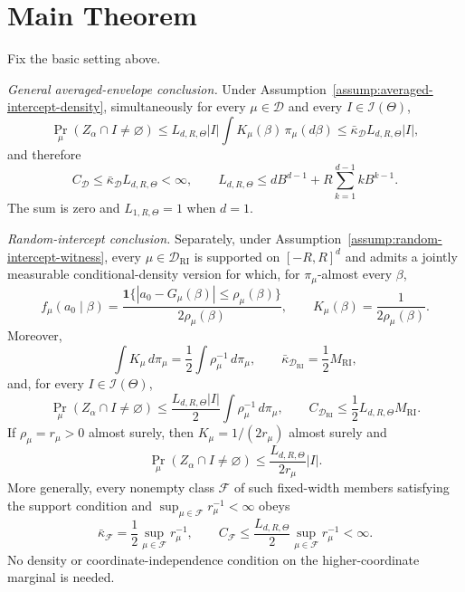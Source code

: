 \section{Main Theorem}

\begin{theorem}
\label{thm:main}
Fix the basic setting above.

\emph{General averaged-envelope conclusion.}
Under Assumption~\ref{assump:averaged-intercept-density}, simultaneously
for every $\mu\in\mathcal D$ and every
$I\in\mathscr I(\Theta)$,
\[
\Pr_\mu(Z_\alpha\cap I\neq\varnothing)
\leq L_{d,R,\Theta}|I|
      \int K_\mu(\beta)\,\pi_\mu(d\beta)
\leq\bar\kappa_{\mathcal D}L_{d,R,\Theta}|I|,
\]
and therefore
\[
C_{\mathcal D}
\leq\bar\kappa_{\mathcal D}L_{d,R,\Theta}<\infty,
\qquad
L_{d,R,\Theta}
\leq dB^{d-1}+R\sum_{k=1}^{d-1}kB^{k-1}.
\]
The sum is zero and $L_{1,R,\Theta}=1$ when $d=1$.

\emph{Random-intercept conclusion.}
Separately, under
Assumption~\ref{assump:random-intercept-witness}, every
$\mu\in\mathcal D_{\mathrm{RI}}$ is supported on $[-R,R]^d$ and admits
a jointly measurable conditional-density version for which, for
$\pi_\mu$-almost every $\beta$,
\[
f_\mu(a_0\mid\beta)
=\frac{\mathbf 1\{|a_0-G_\mu(\beta)|\leq\rho_\mu(\beta)\}}
       {2\rho_\mu(\beta)},
\qquad
K_\mu(\beta)=\frac{1}{2\rho_\mu(\beta)}.
\]
Moreover,
\[
\int K_\mu\,d\pi_\mu
=\frac12\int\rho_\mu^{-1}\,d\pi_\mu,
\qquad
\bar\kappa_{\mathcal D_{\mathrm{RI}}}
=\frac12M_{\mathrm{RI}},
\]
and, for every $I\in\mathscr I(\Theta)$,
\[
\Pr_\mu(Z_\alpha\cap I\neq\varnothing)
\leq\frac{L_{d,R,\Theta}|I|}{2}
      \int\rho_\mu^{-1}\,d\pi_\mu,
\qquad
C_{\mathcal D_{\mathrm{RI}}}
\leq\frac12L_{d,R,\Theta}M_{\mathrm{RI}}.
\]
If $\rho_\mu=r_\mu>0$ almost surely, then
$K_\mu=1/(2r_\mu)$ almost surely and
\[
\Pr_\mu(Z_\alpha\cap I\neq\varnothing)
\leq\frac{L_{d,R,\Theta}}{2r_\mu}|I|.
\]
More generally, every nonempty class $\mathcal F$ of such fixed-width
members satisfying the support condition and
$\sup_{\mu\in\mathcal F}r_\mu^{-1}<\infty$ obeys
\[
\bar\kappa_{\mathcal F}
=\frac12\sup_{\mu\in\mathcal F}r_\mu^{-1},
\qquad
C_{\mathcal F}
\leq\frac{L_{d,R,\Theta}}2
      \sup_{\mu\in\mathcal F}r_\mu^{-1}<\infty.
\]
No density or coordinate-independence condition on the higher-coordinate
marginal is needed.


\end{theorem}
